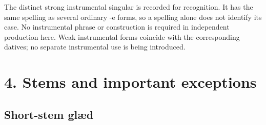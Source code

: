 The distinct strong instrumental singular is recorded for recognition. It has the same spelling as several ordinary -e forms, so a spelling alone does not identify its case. No instrumental phrase or construction is required in independent production here. Weak instrumental forms coincide with the corresponding datives; no separate instrumental use is being introduced.

\section*{4. Stems and important exceptions}

\subsection*{Short-stem glæd}

